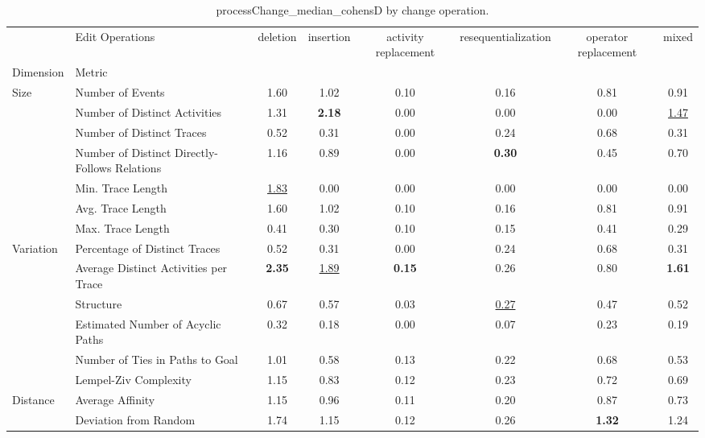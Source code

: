\begin{table}[H]
\centering
\scriptsize
\caption{processChange_median_cohensD by change operation.}
\label{tab:processchange-median-cohensd-by-changeoperation}
\setlength{\tabcolsep}{2pt}  %
\begin{tabular}{llcccccc}
\toprule
              & Edit Operations &  deletion &  insertion &  activity replacement &  resequentialization &  operator replacement &  mixed \\
Dimension & Metric &           &            &                       &                      &                       &        \\
\midrule
Size & Number of Events & 1.60 & 1.02 & 0.10 & 0.16 & 0.81 & 0.91 \\
              & Number of Distinct Activities & 1.31 & \textbf{2.18} & 0.00 & 0.00 & 0.00 & \underline{1.47} \\
              & Number of Distinct Traces & 0.52 & 0.31 & 0.00 & 0.24 & 0.68 & 0.31 \\
              & Number of Distinct Directly-Follows Relations & 1.16 & 0.89 & 0.00 & \textbf{0.30} & 0.45 & 0.70 \\
              & Min. Trace Length & \underline{1.83} & 0.00 & 0.00 & 0.00 & 0.00 & 0.00 \\
              & Avg. Trace Length & 1.60 & 1.02 & 0.10 & 0.16 & 0.81 & 0.91 \\
              & Max. Trace Length & 0.41 & 0.30 & 0.10 & 0.15 & 0.41 & 0.29 \\
Variation & Percentage of Distinct Traces & 0.52 & 0.31 & 0.00 & 0.24 & 0.68 & 0.31 \\
              & Average Distinct Activities per Trace & \textbf{2.35} & \underline{1.89} & \textbf{0.15} & 0.26 & 0.80 & \textbf{1.61} \\
              & Structure & 0.67 & 0.57 & 0.03 & \underline{0.27} & 0.47 & 0.52 \\
              & Estimated Number of Acyclic Paths & 0.32 & 0.18 & 0.00 & 0.07 & 0.23 & 0.19 \\
              & Number of Ties in Paths to Goal & 1.01 & 0.58 & 0.13 & 0.22 & 0.68 & 0.53 \\
              & Lempel-Ziv Complexity & 1.15 & 0.83 & 0.12 & 0.23 & 0.72 & 0.69 \\
Distance & Average Affinity & 1.15 & 0.96 & 0.11 & 0.20 & 0.87 & 0.73 \\
              & Deviation from Random & 1.74 & 1.15 & 0.12 & 0.26 & \textbf{1.32} & 1.24 \\

\end{tabular}
\end{table}
